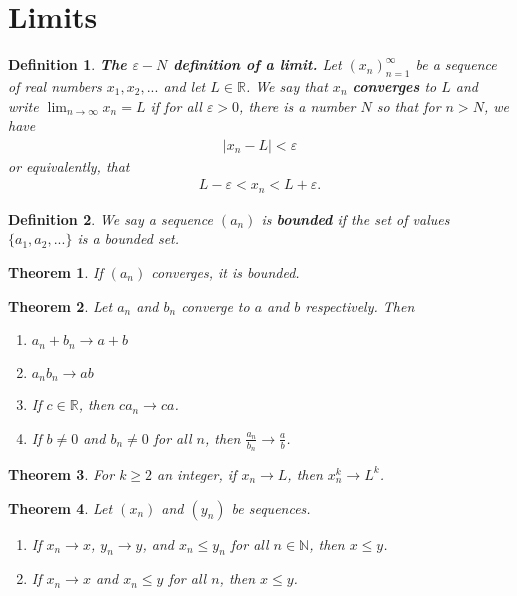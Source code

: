 \documentclass{article}
\theoremstyle{sltheorem}
\newtheorem{definition}{Definition}[section]
\newtheorem{theorem}{Theorem}[section]
\newcommand{\R}{\mathbb{R}}
\newcommand{\N}{\mathbb{N}}
\newcommand*\B[1]{\textbf{#1}}
\begin{document}
\section{Limits}
\begin{definition}
    \B{The $\varepsilon-N$ definition of a limit.} Let $(x_n)^\infty_{n=1}$ be a sequence of real numbers $x_1,x_2,...$ and let $L\in\R$. We say that $x_n$ \B{converges} to $L$ and write $\lim_{n\to\infty}x_n=L$ if for all $\varepsilon>0$, there is a number $N$ so that for $n>N$, we have
    \begin{align*}
        |x_n-L|<\varepsilon
    \end{align*}
    or equivalently, that
    \begin{align*}
        L-\varepsilon<x_n<L+\varepsilon.
    \end{align*}
\end{definition}
\begin{definition}
    We say a sequence $(a_n)$ is \B{bounded} if the set of values $\{a_1, a_2, ...\}$ is a bounded set.
\end{definition}
\begin{theorem}
    If $(a_n)$ converges, it is bounded.
\end{theorem}
\begin{theorem}
    Let $a_n$ and $b_n$ converge to $a$ and $b$ respectively. Then
    \begin{enumerate}
        \item $a_n+b_n\to a+b$
        \item $a_nb_n\to ab$
        \item If $c\in\R$, then $ca_n\to ca$.
        \item If $b\not=0$ and $b_n\not=0$ for all $n$, then $\frac{a_n}{b_n}\to\frac{a}{b}$.
    \end{enumerate}
\end{theorem}
\begin{theorem}
    For $k\geq2$ an integer, if $x_n\to L$, then $x^k_n\to L^k$.
\end{theorem}
\begin{theorem}
    Let $(x_n)$ and $(y_n)$ be sequences.
    \begin{enumerate}
        \item If $x_n\to x$, $y_n\to y$, and $x_n\leq y_n$ for all $n\in\N$, then $x\leq y$.
        \item If $x_n\to x$ and $x_n\leq y$ for all $n$, then $x\leq y$.
    \end{enumerate}
\end{theorem}
\end{document}
